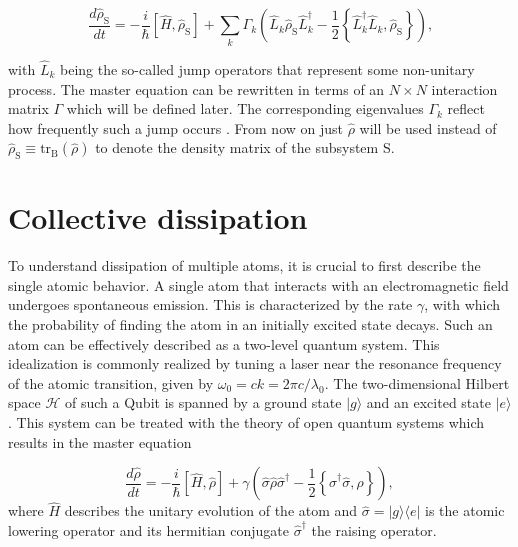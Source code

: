 \begin{equation}\label{eq:ME_in_Linblad_form}
\frac{d\hat{\rho}_\text{S}}{dt} = -\frac{i}{\hbar} [\hat{H}, \hat{\rho}_\text{S}] + \sum_k \Gamma_k \left( \hat{L}_k \hat{\rho}_\text{S} \hat{L}_k^{\dagger} - \frac{1}{2} \left\{ \hat{L}_k^{\dagger} \hat{L}_k, \hat{\rho}_\text{S} \right\} \right) \text{,}
\end{equation}

\noindent
with $ \hat{L}_k $ being the so-called jump operators that
represent some non-unitary process.
The master equation can be rewritten in terms of an $N \times N$ interaction matrix $\Gamma$ which will be defined later.
The corresponding eigenvalues $ \Gamma_k $ reflect how frequently such a jump occurs \cite{Campaioli2024}.
From now on just $ \hat{\rho} $ will be used instead of $ \hat{\rho}_{\text{S}} \equiv  \text{tr}_\text{B}(\hat{\rho})$ to denote the density matrix of the subsystem S.

\section{Collective dissipation}\label{sec:Coherent_Dissipation}
\noindent
To understand dissipation of multiple atoms,
it is crucial to first describe the single atomic behavior.
A single atom that interacts with an electromagnetic field undergoes spontaneous emission.
This is characterized by the rate $\gamma$, with which the probability of finding the atom in an initially excited state decays.
Such an atom can be effectively described as a two-level quantum system.
This idealization is commonly realized by tuning a laser near the resonance frequency of the atomic transition, given by $ \omega_0 = c k = 2 \pi c / \lambda_0 $.
The two-dimensional Hilbert space $\mathcal{H}$ of such a Qubit is spanned by a ground state $\vert g \rangle$
and an excited state $\vert e \rangle$.
This system can be treated with the theory of open quantum systems which results in the master equation \cite{Manzano_2020}

\begin{equation}\label{eq:1atomME}
    \frac{d\hat{\rho}}{dt} = -\frac{i}{\hbar} [\hat{H}, \hat{\rho}] + \gamma \left( \hat{\sigma} \hat{\rho} \hat{\sigma}^\dagger - \frac{1}{2} \left\{ \hat{\sigma}^\dagger \hat{\sigma}, \hat{\rho} \right\} \right) ,
\end{equation}
where $ \hat{H} $ describes the unitary evolution of the atom and $  \hat{\sigma} = \vert g \rangle \langle e \vert $ is the atomic lowering operator and its hermitian conjugate $ \hat{\sigma}^\dagger $ the raising operator.

